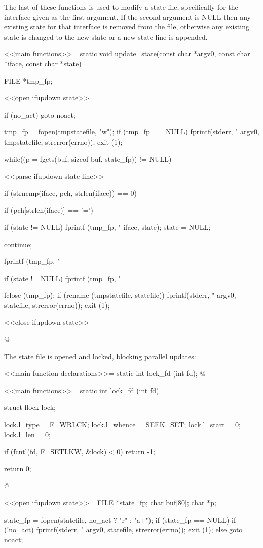 \documentclass{article}
\begin{document}
The last of these functions is used to modify a state file, specifically
for the interface given as the first argument.  If the second argument is
NULL then any existing state for that interface is removed from the file,
otherwise any existing state is changed to the new state or a new state
line is appended.

<<main functions>>=
static void update_state(const char *argv0, const char *iface, const char *state)
{
	FILE *tmp_fp;

	<<open ifupdown state>>

	if (no_act)
		goto noact;

	tmp_fp = fopen(tmpstatefile, "w");
	if (tmp_fp == NULL) {
		fprintf(stderr, 
			"%
			argv0, tmpstatefile, strerror(errno));
		exit (1);
	}

	while((p = fgets(buf, sizeof buf, state_fp)) != NULL) {
		<<parse ifupdown state line>>

		if (strncmp(iface, pch, strlen(iface)) == 0) {
			if (pch[strlen(iface)] == '=') {
				if (state != NULL) {
					fprintf (tmp_fp, "%
						 iface, state);
					state = NULL;
				}

				continue;
			}
		}

		fprintf (tmp_fp, "%
	}

	if (state != NULL)
		fprintf (tmp_fp, "%

	fclose (tmp_fp);
	if (rename (tmpstatefile, statefile)) {
		fprintf(stderr, 
			"%
			argv0, statefile, strerror(errno));
		exit (1);
	}

	<<close ifupdown state>>
}
@ 

The state file is opened and locked, blocking parallel updates:

<<main function declarations>>=
static int lock_fd (int fd);
@ 

<<main functions>>=
static int lock_fd (int fd) {
	struct flock lock;

	lock.l_type = F_WRLCK;
	lock.l_whence = SEEK_SET;
	lock.l_start = 0;
	lock.l_len = 0;

	if  (fcntl(fd, F_SETLKW, &lock) < 0) {
		return -1;
	}

	return 0;
}
@ 

<<open ifupdown state>>=
FILE *state_fp;
char buf[80];
char *p;

state_fp = fopen(statefile, no_act ? "r" : "a+");
if (state_fp == NULL) {
	if (!no_act) {
		fprintf(stderr, 
			"%
			argv0, statefile, strerror(errno));
		exit (1);
	} else {
		goto noact;
	}
}
\end{document}
